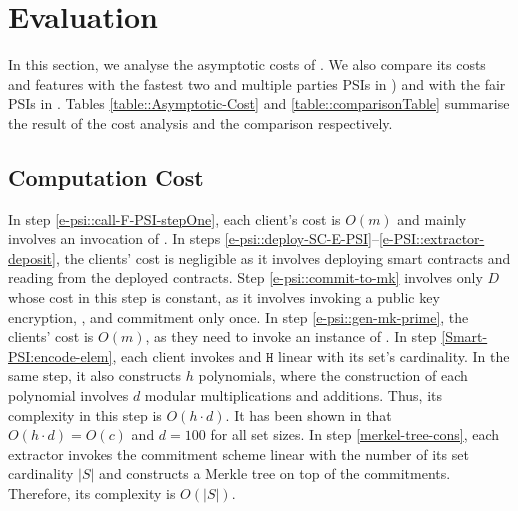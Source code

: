 

\section{Evaluation}\label{sec::valuation}
In this section, we analyse the asymptotic costs of \epsi. We also compare its costs and features with the fastest two and multiple parties PSIs in \cite{AbadiDMT22,DBLP:conf/ccs/KolesnikovMPRT17,NevoTY21,RaghuramanR22}) and with the fair PSIs in \cite{DebnathD16,DBLP:conf/dbsec/DongCCR13}. Tables \ref{table::Asymptotic-Cost} and \ref{table::comparisonTable} summarise the result of the cost analysis and the comparison respectively. 







\subsection{Computation Cost}


In step \ref{e-psi::call-F-PSI-stepOne}, each client's cost is $O(m)$ and mainly involves an invocation of \ct. 
% 
In steps \ref{e-psi::deploy-SC-E-PSI}--\ref{e-PSI::extractor-deposit}, the clients' cost is negligible as it involves deploying smart contracts and reading from the deployed contracts. 
%
Step \ref{e-psi::commit-to-mk} involves only $D$ whose cost in this step is constant, as it involves invoking a public key encryption, \prf,  and commitment only once. In step \ref{e-psi::gen-mk-prime}, the clients' cost is  $O(m)$, as they need to invoke an instance of \ct. 
%
In step \ref{Smart-PSI:encode-elem}, each client invokes \prp and $\mathtt{H}$ linear with its set's cardinality. In the same step, it also constructs $h$ polynomials, where the construction of each polynomial involves $d$  modular multiplications and additions. Thus, its complexity in this step is $O(h\cdot d)$. It has been shown in \cite{AbadiDMT22} that $O(h\cdot d)=O(c)$ and  $d=100$ for all set sizes. 
%
In step \ref{merkel-tree-cons}, each extractor invokes the commitment scheme linear with the number of its set cardinality $|S|$ and constructs a Merkle tree on top of the commitments. Therefore, its complexity is $O(|S|)$. 


